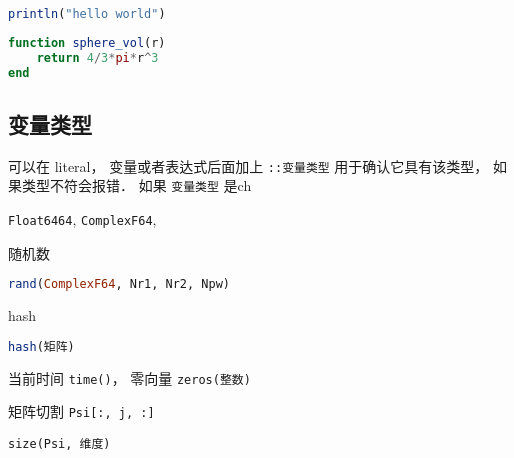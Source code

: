 
\begin{issues}
\issueDraft
\end{issues}

\begin{lstlisting}[language=julia]
println("hello world")
\end{lstlisting}

\begin{lstlisting}[language=julia]
function sphere_vol(r)
    return 4/3*pi*r^3
end
\end{lstlisting}

\subsection{变量类型}
可以在 literal， 变量或者表达式后面加上 \verb|::变量类型| 用于确认它具有该类型， 如果类型不符会报错． 如果 \verb|变量类型| 是ch

\verb|Float6464|, \verb|ComplexF64|, 

随机数
\begin{lstlisting}[language=julia]
rand(ComplexF64, Nr1, Nr2, Npw)
\end{lstlisting}

hash
\begin{lstlisting}[language=julia]
hash(矩阵)
\end{lstlisting}

当前时间 \verb|time()|， 零向量 \verb|zeros(整数)|

矩阵切割 \verb|Psi[:, j, :]|

\verb|size(Psi, 维度)|
